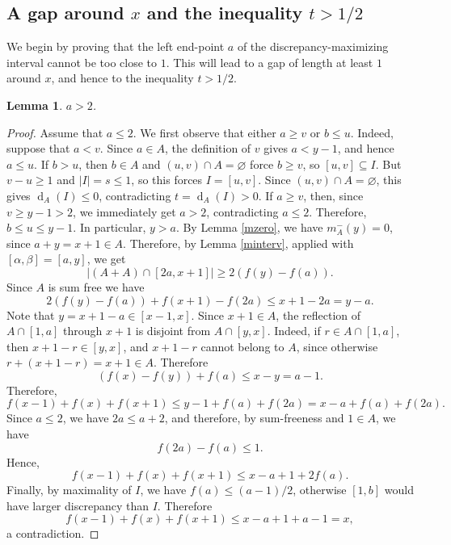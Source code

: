 \documentclass[11pt,reqno]{amsart}
\newtheorem{lem}[thm]{Lemma}
\theoremstyle{definition}
\DeclareMathOperator{\disc}{d}
\def\F#1{f(#1)}
\begin{document}
\subsection{A gap around $x$ and the inequality $t>1/2$}
We begin by proving that the left end-point $a$ of the discrepancy-maximizing interval cannot be too close to $1$. This will lead to a gap of length at least $1$ around $x$, and hence to the inequality $t>1/2$.
\begin{lem}
   $a>2$.
\end{lem}
\begin{proof}
    Assume that $a\leq 2$. We first observe that either $a\geq v$ or $b\leq u$. Indeed, suppose that $a<v$. Since $a\in A$, the definition of $v$ gives $a<y-1$, and hence $a\leq u$. If $b>u$, then $b\in A$ and $(u,v)\cap A=\varnothing$ force $b\geq v$, so $[u,v]\subseteq I$. But $v-u\geq1$ and $|I|=s\leq1$, so this forces $I=[u,v]$. Since $(u,v)\cap A=\varnothing$, this gives $\disc_A(I)\leq0$, contradicting $t=\disc_A(I)>0$. If $a\geq v$, then, since $v\geq y-1>2$, we immediately get $a>2$, contradicting $a\leq2$. Therefore, $b\leq u\leq y - 1$. In particular, $y > a$. By Lemma \ref{mzero}, we have $m_A^-(y)=0$, since $a+y=x+1\in A$.
Therefore, by Lemma \ref{minterv}, applied with
$[\alpha,\beta]=[a,y]$, we get
$$
    |(A+A)\cap[2a,x+1]|\geq 2(\F{y}-\F{a}).
$$
Since $A$ is sum free we have
$$
    2(\F{y}-\F{a})+\F{x+1}-\F{2a}\leq x+1-2a=y-a.
$$
Note that $y = x + 1 - a\in [x - 1, x]$. Since $x+1\in A$, the reflection of $A\cap[1,a]$ through $x+1$ is disjoint
from $A\cap[y,x]$. Indeed, if $r\in A\cap[1,a]$, then $x+1-r\in[y,x]$, and
$x+1-r$ cannot belong to $A$, since otherwise
$r+(x+1-r)=x+1\in A$. Therefore
\begin{equation*}
    (\F{x} - \F{y}) + \F{a} \leq x-y=a - 1. 
\end{equation*}
Therefore, 
\begin{equation*}
    \F{x - 1} + \F{x} + \F{x + 1}
    \leq y - 1 + \F{a} + \F{2a}
    = x - a + \F{a} + \F{2a}. 
\end{equation*}
Since $a\leq 2$, we have $2a\leq a+2$, and therefore, by sum-freeness and $1\in A$, we have
\begin{equation*}
    \F{2a}-\F{a}\leq 1.
\end{equation*}
Hence,  
\begin{equation*}
    \F{x - 1} + \F{x} + \F{x + 1}
    \leq x-a+1+2\F{a}.
\end{equation*}
Finally, by maximality of $I$, we have $\F{a}\leq (a-1)/2$, otherwise $[1,b]$
would have larger discrepancy than $I$. Therefore
\begin{equation*}
    \F{x - 1} + \F{x} + \F{x + 1}
    \leq x-a+1+a-1=x,
\end{equation*}
a contradiction.
\end{proof}
\end{document}

